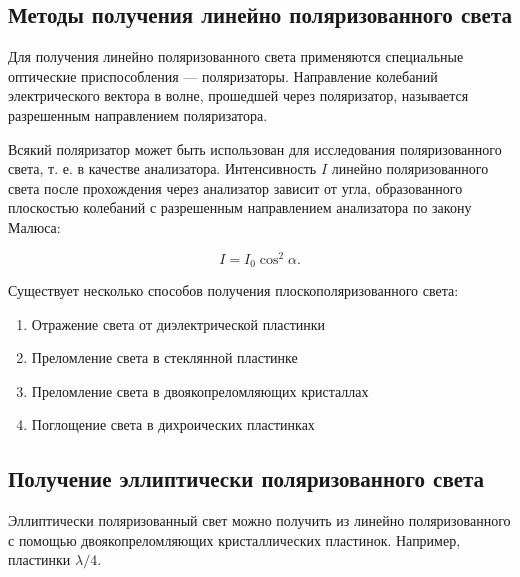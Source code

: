 \documentclass[12pt,a4paper]{article}
\begin{document}
	\subsection*{Методы получения линейно поляризованного света} Для получения линейно поляризованного света применяются специальные оптические приспособления — поляризаторы. Направление колебаний электрического вектора в волне, прошедшей через поляризатор, называется разрешенным направлением поляризатора. 
	
	Всякий поляризатор может быть использован для исследования поляризованного света, т. е. в качестве анализатора. Интенсивность $I$ линейно поляризованного света после прохождения через анализатор зависит от угла, образованного плоскостью колебаний с разрешенным направлением анализатора по закону Малюса:
 
	\begin{equation}
		I = I_0 \cos^2\alpha.
        \label{eq:malus}
	\end{equation}


	Существует несколько способов получения плоскополяризованного света:
	\begin{enumerate}
		\item Отражение света от диэлектрической пластинки
		
		\item Преломление света в стеклянной пластинке
		
		\item Преломление света в двоякопреломляющих кристаллах
		
		\item Поглощение света в дихроических пластинках
	\end{enumerate}
	
	
	\subsection*{Получение эллиптически поляризованного света} Эллиптически поляризованный свет можно получить из линейно поляризованного с помощью двоякопреломляющих кристаллических пластинок. Например, пластинки $\lambda / 4$.
\end{document}
